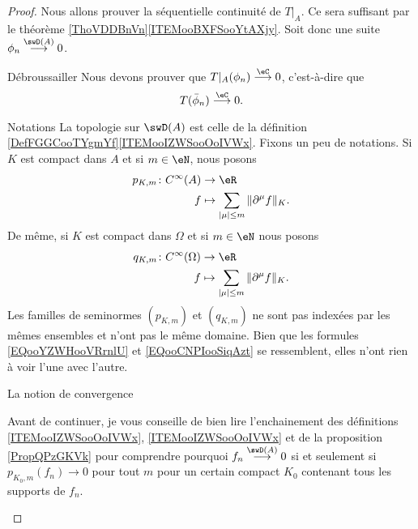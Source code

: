\begin{proof}
    Nous allons prouver la séquentielle continuité de \( T|_A\). Ce sera suffisant par le théorème \ref{ThoVDDBnVn}\ref{ITEMooBXFSooYtAXjy}. Soit donc une suite \( \phi_n\stackrel{\swD(A)}{\longrightarrow}0\). 

    \begin{subproof}
    \item[Débroussailler]
    Nous devons prouver que \( T|_A(\phi_n)\stackrel{\eC}{\longrightarrow}0\), c'est-à-dire que
    \begin{equation}
        T(\bar \phi_n)\stackrel{\eC}{\longrightarrow}0.
    \end{equation}
\item[Notations]
    La topologie sur \( \swD(A)\) est celle de la définition \ref{DefFGGCooTYgmYf}\ref{ITEMooIZWSooOoIVWx}. Fixons un peu de notations. Si \( K\) est compact dans \( A\) et si \( m\in\eN\), nous posons
    \begin{equation}        \label{EQooYZWHooVRrnlU}
        \begin{aligned}
            p_{K,m}\colon  C^{\infty}(A)&\to \eR \\
            f&\mapsto \sum_{| \mu |\leq m}\| \partial^{\mu}f \|_{K}. 
        \end{aligned}
    \end{equation}
    De même, si \( K\) est compact dans \( \Omega\) et si \( m\in \eN\) nous posons
    \begin{equation}        \label{EQooCNPIooSiqAzt}
        \begin{aligned}
            q_{K,m}\colon  C^{\infty}(\Omega)&\to \eR \\
            f&\mapsto \sum_{| \mu |\leq m}\| \partial^{\mu}f \|_{K}. 
        \end{aligned}
    \end{equation}
    Les familles de seminormes \( (p_{K,m})\) et \( (q_{K,m})\) ne sont pas indexées par les mêmes ensembles et n'ont pas le même domaine. Bien que les formules \eqref{EQooYZWHooVRrnlU} et \eqref{EQooCNPIooSiqAzt} se ressemblent, elles n'ont rien à voir l'une avec l'autre.

\item[La notion de convergence]

    Avant de continuer, je vous conseille de bien lire l'enchainement des définitions \ref{ITEMooIZWSooOoIVWx}, \ref{ITEMooIZWSooOoIVWx} et de la proposition \ref{PropQPzGKVk} pour comprendre pourquoi \( f_n\stackrel{\swD(A)}{\longrightarrow}0\) si et seulement si \( p_{K_0,m}(f_n)\to 0\) pour tout \( m\) pour un certain compact \( K_0\) contenant tous les supports de \( f_n\).


\end{subproof}
\end{proof}
